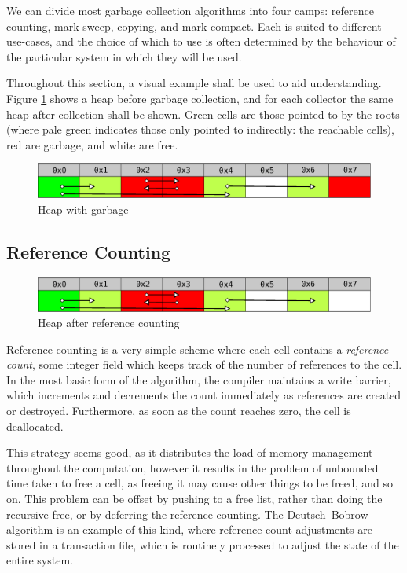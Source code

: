 We can divide most garbage collection algorithms into four camps:
reference counting, mark-sweep, copying, and
mark-compact\cite{GarbageCollection}. Each is suited to different
use-cases, and the choice of which to use is often determined by the
behaviour of the particular system in which they will be used.

Throughout this section, a visual example shall be used to aid
understanding. Figure \ref{fig:lit-gc-before} shows a heap before
garbage collection, and for each collector the same heap after
collection shall be shown. Green cells are those pointed to by the
roots (where pale green indicates those only pointed to indirectly:
the reachable cells), red are garbage, and white are free.

\begin{figure}[h]
  \centering
  \includegraphics[width=\textwidth]{lit-gc-before}
  \caption{Heap with garbage}
  \label{fig:lit-gc-before}
\end{figure}

\subsection{Reference Counting}
\label{sec:lit-gc-refcount}

\begin{figure}[h]
  \centering
  \includegraphics[width=\textwidth]{lit-gc-refcount}
  \caption{Heap after reference counting}
  \label{fig:lit-gc-refcount}
\end{figure}

Reference counting is a very simple scheme where each cell contains a
\textit{reference count}, some integer field which keeps track of the
number of references to the cell. In the most basic form of the
algorithm, the compiler maintains a write barrier, which increments
and decrements the count immediately as references are created or
destroyed. Furthermore, as soon as the count reaches zero, the cell is
deallocated\cite{Collins60}.

This strategy seems good, as it distributes the load of memory
management throughout the computation, however it results in the
problem of unbounded time taken to free a cell, as freeing it may
cause other things to be freed, and so on\cite{GarbageCollection}.
This problem can be offset by pushing to a free list, rather than
doing the recursive free, or by deferring the reference counting. The
Deutsch--Bobrow algorithm is an example of this kind, where reference
count adjustments are stored in a transaction file, which is routinely
processed to adjust the state of the entire system\cite{Deutsch76}.

